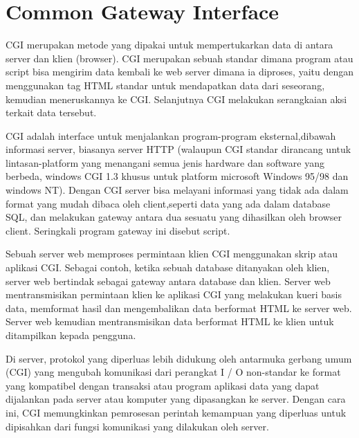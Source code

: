 


\section{Common Gateway Interface}
CGI merupakan metode yang dipakai untuk mempertukarkan data di antara server dan klien (browser). CGI merupakan sebuah standar dimana program atau script bisa mengirim data kembali ke web server dimana ia diproses, yaitu dengan menggunakan tag HTML standar untuk mendapatkan data dari seseorang, kemudian meneruskannya ke CGI. Selanjutnya CGI melakukan serangkaian aksi terkait data tersebut\cite{prihatmoko2013pengembangan}.



\par CGI adalah interface untuk menjalankan program-program eksternal,dibawah informasi server, biasanya server HTTP (walaupun CGI standar dirancang untuk lintasan-platform yang
menangani semua jenis hardware dan software yang berbeda, windows CGI 1.3 khusus untuk platform microsoft Windows 95/98 dan windows NT). Dengan CGI server bisa
melayani informasi yang tidak ada dalam format yang mudah dibaca oleh client,seperti data yang ada dalam database SQL, dan melakukan gateway antara dua sesuatu yang 
dihasilkan oleh browser client. Seringkali program gateway ini disebut script.

\par Sebuah server web memproses permintaan klien CGI menggunakan skrip atau aplikasi CGI. Sebagai contoh, ketika sebuah database ditanyakan oleh klien, 
server web bertindak sebagai gateway antara database dan klien. Server web mentransmisikan permintaan klien ke aplikasi CGI yang melakukan kueri basis data,
 memformat hasil dan mengembalikan data berformat HTML ke server web. Server web kemudian mentransmisikan data berformat HTML ke klien untuk ditampilkan kepada pengguna.

\par Di server, protokol yang diperluas lebih didukung oleh antarmuka gerbang umum (CGI) yang mengubah komunikasi dari perangkat I / O non-standar ke format yang kompatibel 
dengan transaksi atau program aplikasi data yang dapat dijalankan pada server atau komputer yang dipasangkan ke server. 
Dengan cara ini, CGI memungkinkan pemrosesan perintah kemampuan yang diperluas untuk dipisahkan dari fungsi komunikasi yang dilakukan oleh server.

